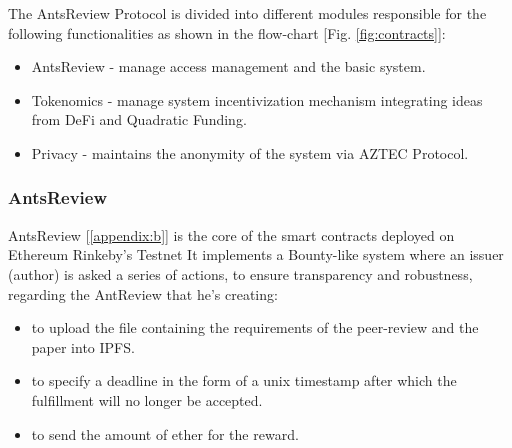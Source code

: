 \documentclass[runningheads]{llncs}
\begin{document}
\newline The AntsReview Protocol is divided into different modules responsible for the following functionalities as shown in the flow-chart [Fig. \ref{fig:contracts}]:

\begin{itemize}
\item AntsReview - manage access management and the basic system.
\item Tokenomics - manage system incentivization mechanism integrating ideas from DeFi and Quadratic Funding.
\item Privacy - maintains the anonymity of the system via AZTEC Protocol.
\end{itemize}

\subsubsection{AntsReview}

AntsReview [\ref{appendix:b}] is the core of the smart contracts deployed on Ethereum Rinkeby's Testnet \cite{Rinkeby}
\newline It implements a Bounty-like system where an issuer (author) is asked a series of actions, to ensure transparency and robustness, regarding the AntReview that he's creating:
\begin{itemize}
  \item to upload the file containing the requirements of the peer-review and the paper into IPFS.
  \item to specify a deadline in the form of a unix timestamp after which the fulfillment will no longer be accepted.
  \item to send the amount of ether for the reward.
\end{itemize}
\end{document}
